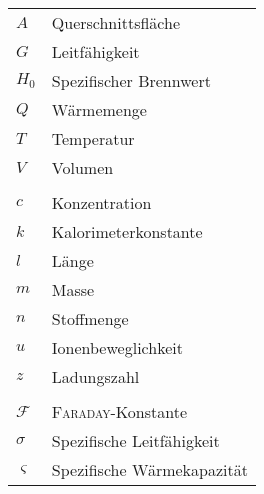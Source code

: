\begin{table}[h]
    \begin{tabular}{@{}ll@{}}%
        \(A\) & Querschnittsfläche\\
        \(G\) & Leitfähigkeit\\
        \(H_0\) & Spezifischer Brennwert\\
        \(Q\) & Wärmemenge\\
        \(T\) & Temperatur\\
        \(V\) & Volumen\\
        \(\) & \\
        \(c\) & Konzentration\\
        \(k\) & Kalorimeterkonstante\\
        \(l\) & Länge\\
        \(m\) & Masse\\
        \(n\) & Stoffmenge\\
        \(u\) & Ionenbeweglichkeit\\
        \(z\) & Ladungszahl\\
        \(\) & \\
        \(\mathcal{F}\) & \textsc{Faraday}-Konstante\\
        \(\sigma\) & Spezifische Leitfähigkeit\\
        \(\varsigma\) & Spezifische Wärmekapazität\\
    \end{tabular}
    \label{tab:glossar}
\end{table}